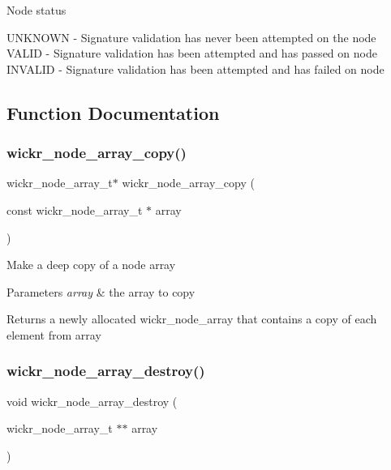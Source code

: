 Node status

U\+N\+K\+N\+O\+WN -\/ Signature validation has never been attempted on the node V\+A\+L\+ID -\/ Signature validation has been attempted and has passed on node I\+N\+V\+A\+L\+ID -\/ Signature validation has been attempted and has failed on node 

\subsection{Function Documentation}
\mbox{\label{group__wickr__node_gab577103b1752357b8575b064e22a4970}} 
\subsubsection{\texorpdfstring{wickr\_node\_array\_copy()}{wickr\_node\_array\_copy()}}
{\footnotesize\ttfamily wickr\+\_\+node\+\_\+array\+\_\+t$\ast$ wickr\+\_\+node\+\_\+array\+\_\+copy (\begin{DoxyParamCaption}\item[{const wickr\+\_\+node\+\_\+array\+\_\+t $\ast$}]{array }\end{DoxyParamCaption})}

Make a deep copy of a node array


\begin{DoxyParams}{Parameters}
{\em array} & the array to copy \\
\hline
\end{DoxyParams}
\begin{DoxyReturn}{Returns}
a newly allocated wickr\+\_\+node\+\_\+array that contains a copy of each element from \textquotesingle{}array\textquotesingle{} 
\end{DoxyReturn}
\mbox{\label{group__wickr__node_gab3f40f122baca50bcc62af54eaa08fe9}} 
\subsubsection{\texorpdfstring{wickr\_node\_array\_destroy()}{wickr\_node\_array\_destroy()}}
{\footnotesize\ttfamily void wickr\+\_\+node\+\_\+array\+\_\+destroy (\begin{DoxyParamCaption}\item[{wickr\+\_\+node\+\_\+array\+\_\+t $\ast$$\ast$}]{array }\end{DoxyParamCaption})}

